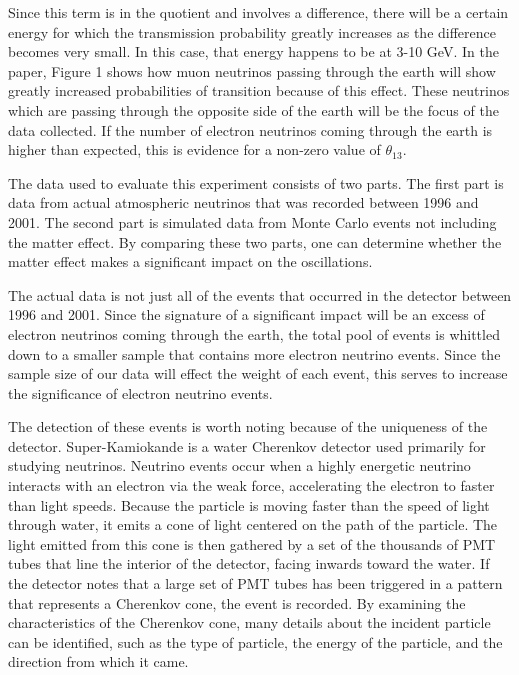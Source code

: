 \documentclass[letter,12pt]{article}
\begin{document}
Since this term is in the quotient and involves a difference, there
will be a certain energy for which the transmission probability
greatly increases as the difference becomes very small. In this case,
that energy happens to be at 3-10 GeV. In the paper, Figure 1 shows
how muon neutrinos passing through the earth will show greatly increased
probabilities of transition because of this effect. These neutrinos
which are passing through the opposite side of the earth will be
the focus of the data collected. If the number of electron neutrinos
coming through the earth is higher than expected, this is evidence
for a non-zero value of $\theta_{13}$.

The data used to evaluate this experiment consists of two parts. 
The first part is data from actual atmospheric neutrinos that was 
recorded between 1996 and 2001. The second part is simulated data
from Monte Carlo events not including the matter effect. By
comparing these two parts, one can determine whether the matter
effect makes a significant impact on the oscillations. 

The actual data is not just all of the events that occurred in the
detector between 1996 and 2001. Since the signature of a significant 
impact will be an excess of electron neutrinos coming through the earth, 
the total pool of events is whittled down to a smaller sample that
contains more electron neutrino events. Since the sample size of 
our data will effect the weight of each event, this serves to increase
the significance of electron neutrino events. 

The detection of these events is worth noting because of the uniqueness
of the detector. Super-Kamiokande is a water Cherenkov detector used
primarily for studying neutrinos. Neutrino events occur when a highly
energetic neutrino interacts with an electron via the weak force,
accelerating the electron to faster than light speeds. Because the particle 
is moving faster than the speed of light through water, it emits
a cone of light centered on the path of the particle. The light emitted
from this cone is then gathered by a set of the thousands of PMT tubes 
that line the interior of the detector, facing inwards toward the water. 
If the detector notes that a large set of PMT tubes has been triggered
in a pattern that represents a Cherenkov cone, the event is recorded.
By examining the characteristics of the Cherenkov cone, many details 
about the incident particle can be identified, such as the type of particle,
the energy of the particle, and the direction from which it came.
\end{document}
